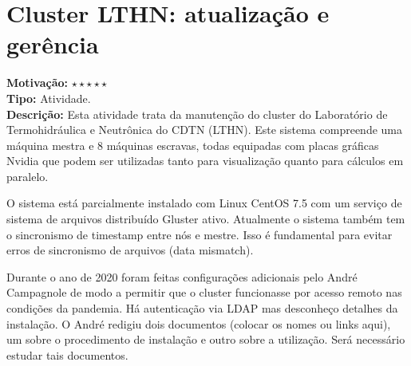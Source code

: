 \chapter{Cluster LTHN: atualização e gerência}
\label{chap:cluster}

\textbf{Motivação:} $\star\star\star\star\star$\\

\textbf{Tipo:} Atividade.\\

\textbf{Descrição:} Esta atividade trata da manutenção do cluster do Laboratório 
de Termohidráulica e Neutrônica do CDTN (LTHN). Este sistema compreende uma máquina mestra e 8 máquinas escravas, todas equipadas com placas gráficas Nvidia que podem ser utilizadas tanto para visualização quanto para cálculos em paralelo.

O sistema está parcialmente instalado com Linux CentOS 7.5 com um serviço de 
sistema de arquivos distribuído Gluster ativo. Atualmente o sistema também tem 
o sincronismo de timestamp entre nós e mestre. Isso é fundamental para evitar 
erros de sincronismo de arquivos (data mismatch).



Durante o ano de 2020 foram feitas configurações adicionais pelo André Campagnole de modo a
permitir que o cluster funcionasse por acesso remoto nas condições da pandemia. Há autenticação
via LDAP mas desconheço detalhes da instalação. O André redigiu dois documentos (colocar os nomes ou links aqui),
um sobre o procedimento de instalação e outro sobre a utilização. Será necessário estudar tais documentos.


